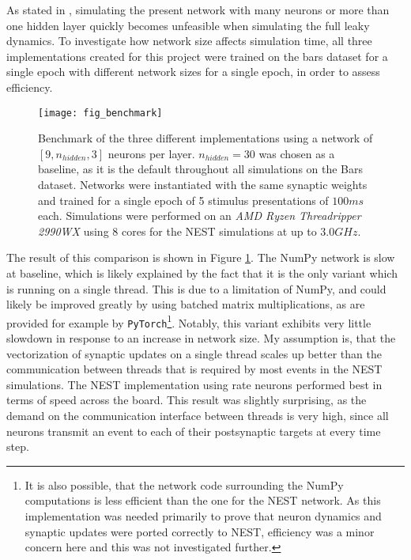 As stated in \cite{Haider2021}, simulating the present network with many neurons or more than one hidden layer quickly
becomes unfeasible when simulating the full leaky dynamics. To investigate how network size affects simulation time, all
three implementations created for this project were trained on the bars dataset for a single epoch with different
network sizes for a single epoch, in order to assess efficiency.


\begin{figure}[t]
    \centering
    \texttt{[image: fig\_benchmark]}
    \caption{Benchmark of the three different implementations using a network of $[9, n_{hidden}, 3]$ neurons per layer.
        $n_{hidden}=30$ was chosen as a baseline, as it is the default throughout all simulations on the Bars dataset.
        Networks were instantiated with the same synaptic weights and trained for a single epoch of 5 stimulus
        presentations of $100ms$ each. Simulations were performed on an \textit{AMD Ryzen Threadripper 2990WX} using 8
        cores for the NEST simulations at up to $3.0GHz$.}
    \label{fig-benchmark}
\end{figure}

The result of this comparison is shown in Figure \ref{fig-benchmark}. The NumPy network is slow at baseline, which is
likely explained by the fact that it is the only variant which is running on a single thread. This is due to a
limitation of NumPy, and could likely be improved greatly by using batched matrix multiplications, as are provided for
example by \texttt{PyTorch}\footnote{It is also possible, that the network code surrounding the NumPy computations is
    less efficient than the one for the NEST network. As this implementation was needed primarily to prove that neuron
    dynamics and synaptic updates were ported correctly to NEST, efficiency was a minor concern here and this was not
    investigated further.}.  Notably, this variant exhibits very little slowdown in response to an increase in network size.
My assumption is, that the vectorization of synaptic updates on a single thread scales up better than the communication
between threads that is required by most events in the NEST simulations. The NEST implementation using rate neurons
performed best in terms of speed across the board. This result was slightly surprising, as the demand on the
communication interface between threads is very high, since all neurons transmit an event to each of their postsynaptic
targets at every time step.

